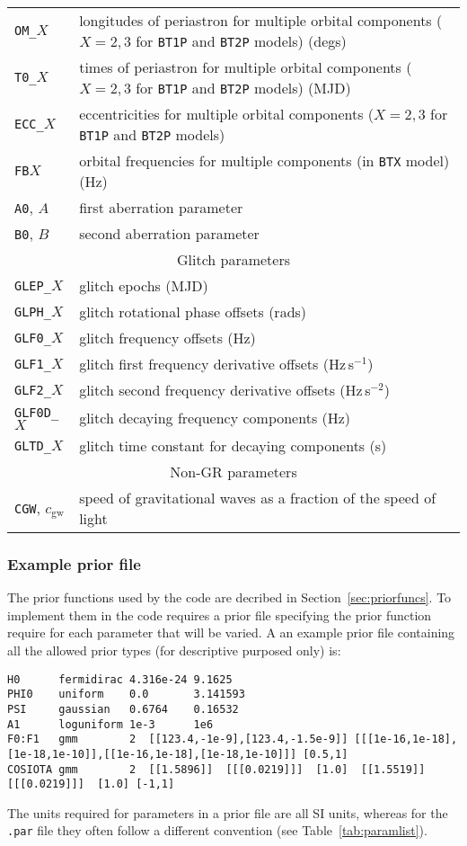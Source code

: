 \begin{longtable}{l|l}
{\tt OM\_}$X$ & longitudes of periastron for multiple orbital components ($X=2,3$ for {\tt BT1P} and {\tt BT2P} models) (degs) \\
{\tt T0\_}$X$ & times of periastron for multiple orbital components ($X=2,3$ for {\tt BT1P} and {\tt BT2P} models) (MJD) \\
{\tt ECC\_}$X$ & eccentricities for multiple orbital components ($X=2,3$ for {\tt BT1P} and {\tt BT2P} models) \\
{\tt FB}$X$ & orbital frequencies for multiple components (in {\tt BTX} model) (Hz) \\
{\tt A0}, $A$ & first aberration parameter \citep[see e.g.\ Section~2.7.3 of][]{2006MNRAS.372.1549E} \\
{\tt B0}, $B$ & second aberration parameter \citep[see e.g.\ Section~2.7.3 of][]{2006MNRAS.372.1549E} \\
\hline
\multicolumn{2}{c}{Glitch parameters \citep[see][]{2006MNRAS.369..655H,2013MNRAS.429..688Y}} \\
\hline
{\tt GLEP\_}$X$ & glitch epochs (MJD) \\
{\tt GLPH\_}$X$ & glitch rotational phase offsets (rads) \\
{\tt GLF0\_}$X$ & glitch frequency offsets (Hz) \\
{\tt GLF1\_}$X$ & glitch first frequency derivative offsets (Hz\,s$^{-1}$) \\
{\tt GLF2\_}$X$ & glitch second  frequency derivative offsets (Hz\,s$^{-2}$) \\
{\tt GLF0D\_}$X$ & glitch decaying frequency components (Hz) \\
{\tt GLTD\_}$X$ & glitch time constant for decaying components (s) \\
\hline
\multicolumn{2}{c}{Non-GR parameters} \\
\hline
{\tt CGW}, $c_{\text{gw}}$ & speed of gravitational waves as a fraction of the speed of light \\
\hline
\hline
\end{longtable}


\subsubsection{Example prior file}

The prior functions used by the code are decribed in Section~\ref{sec:priorfuncs}. To implement them in the code requires a prior
file specifying the prior function require for each parameter that will be varied. A an example prior file containing all the
allowed prior types (for descriptive purposed only) is:
\begin{lstlisting}[frame=single]
H0      fermidirac 4.316e-24 9.1625
PHI0    uniform    0.0       3.141593
PSI     gaussian   0.6764    0.16532
A1      loguniform 1e-3      1e6
F0:F1   gmm        2  [[123.4,-1e-9],[123.4,-1.5e-9]] [[[1e-16,1e-18],[1e-18,1e-10]],[[1e-16,1e-18],[1e-18,1e-10]]] [0.5,1]
COSIOTA gmm        2  [[1.5896]]  [[[0.0219]]]  [1.0]  [[1.5519]]  [[[0.0219]]]  [1.0] [-1,1]
\end{lstlisting}
The units required for parameters in a prior file are all SI units, whereas for the {\tt .par} file they often follow a different
convention (see Table~\ref{tab:paramlist}).

